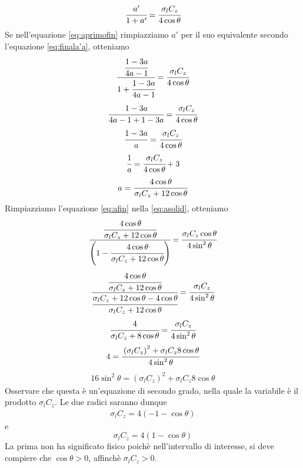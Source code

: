 \begin{equation}\label{eq:aprimofin}
\cfrac{a'}{1+a'} = \cfrac{\sigma_l C_z}{4 \cos \theta}
\end{equation}
Se nell'equazione \ref{eq:aprimofin} rimpiazziamo $a'$ per il suo equivalente secondo l'equazione \ref{eq:finala'a}, otteniamo
\begin{align*}
\cfrac{\cfrac{1-3a}{4a-1}}{1+\cfrac{1-3a}{4a-1}} = \cfrac{\sigma_l C_z}{4 \cos \theta}
\end{align*}
\begin{align*}
\cfrac{1-3a}{4a-1+1-3a} = \cfrac{\sigma_l C_z}{4 \cos \theta}
\end{align*}
\begin{align*}
\cfrac{1-3a}{a} = \cfrac{\sigma_l C_z }{4 \cos \theta}
\end{align*}
\begin{align*}
\cfrac{1}{a} = \cfrac{\sigma_l C_z}{4 \cos \theta} + 3
\end{align*}
\begin{equation}\label{eq:afin}
a = \cfrac{4 \cos \theta}{\sigma_l C_z +12 \cos \theta}
\end{equation}
Rimpiazziamo l'equazione \ref{eq:afin} nella \ref{eq:asolid}, otteniamo
\begin{align*}
\cfrac{\cfrac{4 \cos \theta}{\sigma_l C_z + 12 \cos \theta}}{\left( 1- \cfrac{4 \cos \theta}{\sigma_l C_z + 12 \cos \theta} \right)} = \cfrac{\sigma_l C_z \cos \theta}{4 \sin^2 \theta}
\end{align*}
\begin{align*}
\cfrac{\cfrac{4 \cos \theta}{\sigma_l C_z + 12 \cos \theta}}{\cfrac{\sigma_l C_z + 12 \cos \theta - 4 \cos \theta}{\sigma_l C_z + 12 \cos \theta}} = \cfrac{\sigma_l C_z}{4 \sin^2 \theta}
\end{align*}
\begin{align*}
\cfrac{4}{\sigma_l C_z + 8 \cos \theta} = \cfrac{\sigma_l C_z}{4 \sin^2 \theta}
\end{align*}
\begin{align*}
4 = \cfrac{\left( \sigma_l C_z \right)^2 + \sigma_l C_z 8 \cos \theta}{4 \sin^2 \theta}
\end{align*}
\begin{align*}
16 \sin^2 \theta = \left( \sigma_l C_z \right)^2 + \sigma_l C_z 8 \cos \theta
\end{align*}
Osservare che questa è un'equazione di secondo grado, nella quale la variabile è il prodotto $\sigma_l C_z$. Le due radici saranno dunque
\begin{align*}
\sigma_l C_z = 4 \left(-1 -\cos \theta \right)
\end{align*}
e
\begin{equation}\label{eq:sigmazc}
\sigma_l C_z = 4 \left(1- \cos \theta \right)
\end{equation}
La prima non ha significato fisico poichè nell'intervallo di interesse, si deve compiere che $\cos \theta > 0 $, affinchè $\sigma_l C_z > 0$.

